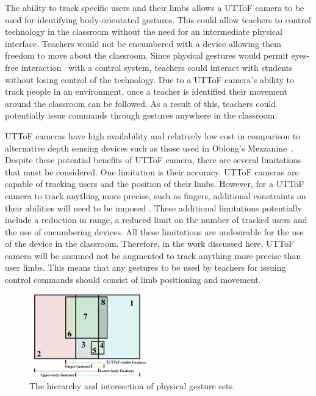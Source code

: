 \documentclass[manuscript, review, screen]{acmart}
\begin{document}

The ability to track specific users and their limbs allows a \ac{UTToF} camera to be used for identifying body-orientated gestures.
This could allow teachers to control technology in the classroom without the need for an intermediate physical interface.
Teachers would not be encumbered with a device allowing them freedom to move about the classroom.
Since physical gestures would permit eyes-free interaction~\cite{Brewster2003} with a control system, teachers could interact with students without losing control of the technology.
Due to a \ac{UTToF} camera's ability to track people in an environment, once a teacher is identified their movement around the classroom can be followed.
As a result of this, teachers could potentially issue commands through gestures anywhere in the classroom.

\ac{UTToF} cameras have high availability and relatively low cost in comparison to alternative depth sensing devices such as those used in Oblong's Mezzanine~\cite{kramer2011}.
Despite these potential benefits of \ac{UTToF} camera, there are several limitations that must be considered.
One limitation is their accuracy.
\ac{UTToF} cameras are capable of tracking users and the position of their limbs.
However, for a \ac{UTToF} camera to track anything more precise, such as fingers, additional constraints on their abilities will need to be imposed \cite{Clark2011}.
These additional limitations potentially include a reduction in range, a reduced limit on the number of tracked users and the use of encumbering devices.
All these limitations are undesirable for the use of the device in the classroom.
Therefore, in the work discussed here, \ac{UTToF} camera will be assumed not be augmented to track anything more precise than user limbs.
This means that any gestures to be used by teachers for issuing control commands should consist of limb positioning and movement.

\begin{figure}[t]
   \centering
   \includegraphics[width=0.45\textwidth]{figures/gestures_venn_diagram.png}
   \caption{The hierarchy and intersection of physical gesture sets.}
   \label{fig:gestureVenn}
\end{figure}
\end{document}
